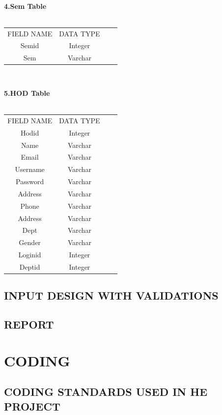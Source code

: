 \documentclass[a4paper, 12pt]{report}
\begin{document}
{{\begin{tabular}{|c|c|c|c|}
\end{tabular} 
\\{\fontsize{14pt}{14pt}\selectfont\textbf{4.Sem Table}
\\
\\
\begin{tabular}{|c|c|c|c|}
\hline 
FIELD NAME&DATA TYPE\\
Semid&Integer\\
\hline 
Sem&Varchar\\
\hline
\end{tabular}
\\{\fontsize{14pt}{14pt}\selectfont\textbf{5.HOD Table}
\\
\\
\begin{tabular}{|c|c|c|c|}
\hline 
FIELD NAME&DATA TYPE\\
Hodid&Integer\\
\hline 
Name&Varchar\\
\hline
Email&Varchar\\
\hline
Username&Varchar\\
\hline
Password&Varchar\\
\hline
Address&Varchar\\
\hline
Phone&Varchar\\
\hline
Address&Varchar\\
\hline
Dept&Varchar\\
\hline
Gender&Varchar\\
\hline
Loginid&Integer\\
\hline
Deptid&Integer\\
\hline

\end{tabular}  

\subsection{INPUT DESIGN WITH VALIDATIONS}
\subsection{REPORT}
\newpage
\section{CODING}
\subsection{CODING STANDARDS USED IN HE PROJECT}
\fontsize{12pt}{12pt}\selectfont

\newpage
}}}}
\end{document}
